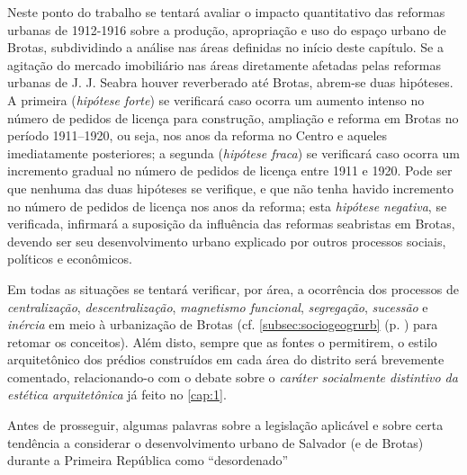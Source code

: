 Neste ponto do trabalho se tentará avaliar o impacto quantitativo das reformas urbanas de 1912-1916 sobre a produção, apropriação e uso do espaço urbano de Brotas, subdividindo a análise nas áreas definidas no início deste capítulo. Se a agitação do mercado imobiliário nas áreas diretamente afetadas pelas reformas urbanas de J. J. Seabra houver reverberado até Brotas, abrem-se duas hipóteses. A primeira (\textit{hipótese forte}) se verificará caso ocorra um aumento intenso no número de pedidos de licença para construção, ampliação e reforma em Brotas no período 1911--1920, ou seja, nos anos da reforma no Centro e aqueles imediatamente posteriores; a segunda (\textit{hipótese fraca}) se verificará caso ocorra um incremento gradual no número de pedidos de licença entre 1911 e 1920. Pode ser que nenhuma das duas hipóteses se verifique, e que não tenha havido incremento no número de pedidos de licença nos anos da reforma; esta \textit{hipótese negativa}, se verificada, infirmará a suposição da influência das reformas seabristas em Brotas, devendo ser seu desenvolvimento urbano explicado por outros processos sociais, políticos e econômicos.

Em todas as situações se tentará verificar, por área, a ocorrência dos processos de \textit{centralização}, \textit{descentralização}, \textit{magnetismo funcional}, \textit{segregação}, \textit{sucessão} e \textit{inércia} em meio à urbanização de Brotas (cf. \autoref{subsec:sociogeogrurb} (p. \pageref{subsec:sociogeogrurb}) para retomar os conceitos). Além disto, sempre que as fontes o permitirem, o estilo arquitetônico dos prédios construídos em cada área do distrito será brevemente comentado, relacionando-o com o debate sobre o \textit{caráter socialmente distintivo da estética arquitetônica} já feito no \autoref{cap:1}.

Antes de prosseguir, algumas palavras sobre a legislação aplicável e sobre certa tendência a considerar o desenvolvimento urbano de Salvador (e de Brotas) durante a Primeira República como ``desordenado''


